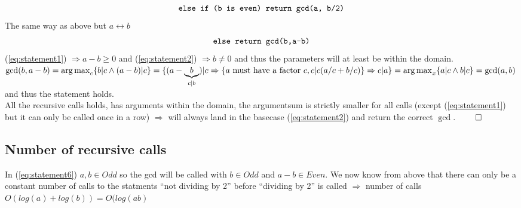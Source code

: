 \documentclass[a4paper,twoside=false,abstract=false,numbers=noenddot,
titlepage=false,headings=small,parskip=half,version=last]{scrartcl}
\DeclareMathOperator*{\argmax}{arg\,max}
\begin{document}
\begin{equation} \label{eq:statement5}
    \verb+else if (b is even) return gcd(a, b/2)+
\end{equation}
The same way as above but $a \leftrightarrow b$
\begin{equation} \label{eq:statement6}
    \verb+else return gcd(b,a-b)+
\end{equation}
(\ref{eq:statement1}) $\Rightarrow a-b \ge 0$ and (\ref{eq:statement2}) $\Rightarrow b \neq 0$ and thus the parameters will at least be within the domain. \\

$
    \gcd(b,a-b)=\argmax_c \{b|c \wedge (a-b)|c\}=\\
    \{ (a-\underbrace{b}_{c|b})|c \Rightarrow
    \{ \text{$a$ must have a factor $c$}, c|c(a/c+b/c) \} \Rightarrow
    c|a \}\\
    =\argmax_x \{a|c \wedge b|c\}=\gcd(a,b)
$
and thus the statement holds. \\

All the recursive calls holds, has arguments within the domain, the argumentsum is strictly smaller for all calls 
(except (\ref{eq:statement1}) but it can only be called once in a row) 
$\Rightarrow$ will always land in the basecase (\ref{eq:statement2}) and return the correct $\gcd$. $\qed$

\subsection{Number of recursive calls}

In (\ref{eq:statement6}) $a,b \in Odd$ so the gcd will be called with $b \in Odd$ and $a-b \in Even$. %
We now know from above that there can only be a constant number of calls to the statments ``not dividing by 2'' before ``dividing by 2'' is called $\Rightarrow$ number of calls $O(log(a)+log(b))=O(log(ab)$

\end{document}
